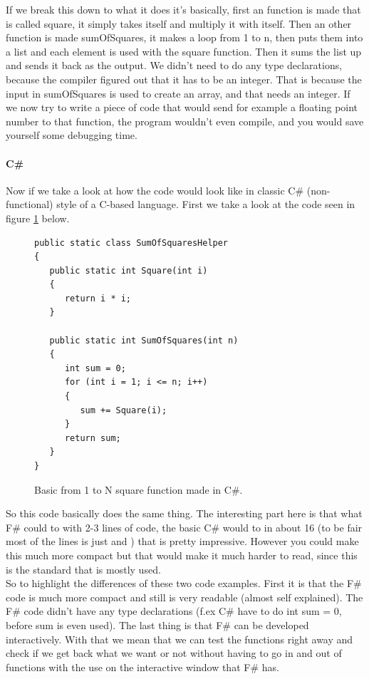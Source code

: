 \documentclass[12pt, a4paper]{article}
\begin{document}
If we break this down to what it does it’s basically, first an function is made that is called square, it simply takes itself and multiply it with itself. Then an other function is made sumOfSquares, it makes a loop from 1 to n, then puts them into a list and each element is used with the square function. Then it sums the list up and sends it back as the output. We didn’t need to do any type declarations, because the compiler figured out that it has to be an integer. That is because the input in sumOfSquares is used to create an array, and that needs an integer. If we now try to write a piece of code that would send for example a floating point number to that function, the program wouldn’t even compile, and you would save yourself some debugging time.\\

\newpage

\paragraph{C\#}
Now if we take a look at how the code would look like in classic C\# (non-functional) style of a C-based language. First we take a look at the code seen in figure \ref{fig:SquareFunctionCSharp} below.

\begin{figure}[!h]
\begin{lstlisting}
public static class SumOfSquaresHelper
{
   public static int Square(int i)
   {
      return i * i;
   }

   public static int SumOfSquares(int n)
   {
      int sum = 0;
      for (int i = 1; i <= n; i++)
      {
         sum += Square(i);
      }
      return sum;
   }
}
\end{lstlisting}
\caption{Basic from 1 to N square function made in C\#.}
\label{fig:SquareFunctionCSharp}
\end{figure}

So this code basically does the same thing. The interesting part here is that what F\# could to with 2-3 lines of code, the basic C\# would to in about 16 (to be fair most of the lines is just { and }) that is pretty impressive. However you could make this much more compact but that would make it much harder to read, since this is the standard that is mostly used.\\

So to highlight the differences of these two code examples. First it is that the F\# code is much more compact and still is very readable (almost self explained). The F\# code didn't have any type declarations (f.ex C\# have to do int sum = 0, before sum is even used). The last thing is that F\# can be developed interactively. With that we mean that we can test the functions right away and check if we get back what we want or not without having to go in and out of functions with the use on the interactive window that F\# has.
\end{document}
